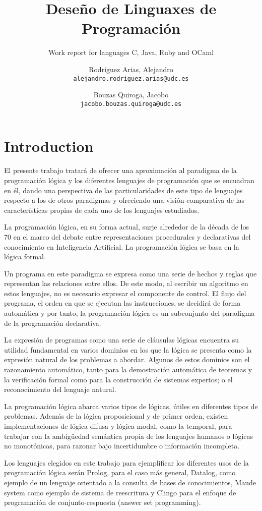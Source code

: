 \documentclass[11pt,captions=nooneline,DIV=14, parskip=full]{scrartcl}
\title{Deseño de Linguaxes de Programación}
\subtitle{Work report for languages C, Java, Ruby and OCaml}
\author{Rodríguez Arias, Alejandro\\
	\texttt{alejandro.rodriguez.arias@udc.es}
	\and Bouzas Quiroga, Jacobo\\
	\texttt{jacobo.bouzas.quiroga@udc.es}}
\date{\displaydate{release}}
\begin{document}
\maketitle
\clearpage
\clearpage

\section{Introduction}
\label{sec:intro}

El presente trabajo tratará de ofrecer una aproximación al paradigma de la programación lógica y los diferentes lenguajes de programación que se encuadran en él, dando una perspectiva de las particularidades de este tipo de lenguajes respecto a los de otros paradigmas y ofreciendo una visión comparativa de las características propias de cada uno de los lenguajes estudiados.

La programación lógica, en su forma actual, surje alrededor de la década de los 70 en el marco del debate entre representaciones procedurales y declarativas del conocimiento en Inteligencia Artificial. La programación lógica se basa en la lógica formal.

Un programa en este paradigma se expresa como una serie de hechos y reglas que representan las relaciones entre ellos. De este modo, al escribir un algoritmo en estos lenguajes, no es necesario expresar el componente de control. El flujo del programa, el orden en que se ejecutan las instrucciones, se decidirá de forma automática y por tanto, la programación lógica es un subconjunto del paradigma de la programación declarativa.

La expresión de programas como una serie de cláusulas lógicas encuentra su utilidad fundamental en varios dominios en los que la lógica se presenta como la expresión natural de los problemas a abordar. Algunos de estos dominios son el razonamiento automático, tanto para la demostración automática de teoremas y la verificación formal como para la construcción de sistemas expertos; o el reconocimiento del lenguaje natural.

La programación lógica abarca varios tipos de lógicas, útiles en diferentes tipos de problemas. Además de la lógica proposicional y de primer orden, existen implementaciones de lógica difusa y lógica modal, como la temporal, para trabajar con la ambigüedad semántica propia de los lenguajes humanos o lógicas no monotónicas, para razonar bajo incertidumbre o información incompleta.

Los lenguajes elegidos en este trabajo para ejemplificar los diferentes usos de la programación lógica serán Prolog, para el caso más general, Datalog, como ejemplo de un lenguaje orientado a la consulta de bases de conocimientos, Maude system como ejemplo de sistema de reescritura y Clingo para el enfoque de programación de conjunto-respuesta (answer set programming).
\end{document}
